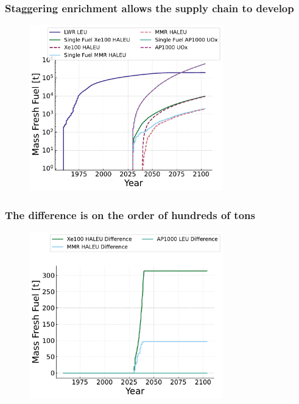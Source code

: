 \documentclass[9pt]{beamer}
\begin{document}
  \begin{frame}
    \frametitle{Staggering enrichment allows the supply chain to develop}
    \begin{figure}
        \centering
        \includegraphics[width=0.75\textwidth]{images/fresh_fuel.pdf}
    \end{figure}
  \end{frame}

  \begin{frame}
    \frametitle{The difference is on the order of hundreds of tons}
    \begin{figure}
        \centering
        \includegraphics[width=0.75\textwidth]{images/fresh_fuel_difference.pdf}
    \end{figure}
  \end{frame}
\end{document}
